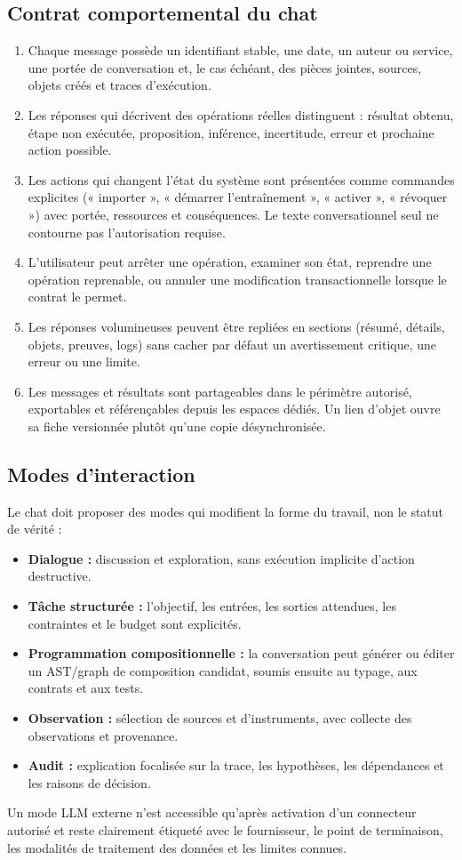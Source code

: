 \documentclass[11pt,a4paper]{article}
\begin{document}
\subsection{Contrat comportemental du chat}
\begin{enumerate}
\item Chaque message possède un identifiant stable, une date, un auteur ou service, une portée de conversation et, le cas échéant, des pièces jointes, sources, objets créés et traces d'exécution.
\item Les réponses qui décrivent des opérations réelles distinguent : résultat obtenu, étape non exécutée, proposition, inférence, incertitude, erreur et prochaine action possible.
\item Les actions qui changent l'état du système sont présentées comme commandes explicites (« importer », « démarrer l'entraînement », « activer », « révoquer ») avec portée, ressources et conséquences. Le texte conversationnel seul ne contourne pas l'autorisation requise.
\item L'utilisateur peut arrêter une opération, examiner son état, reprendre une opération reprenable, ou annuler une modification transactionnelle lorsque le contrat le permet.
\item Les réponses volumineuses peuvent être repliées en sections (résumé, détails, objets, preuves, logs) sans cacher par défaut un avertissement critique, une erreur ou une limite.
\item Les messages et résultats sont partageables dans le périmètre autorisé, exportables et référençables depuis les espaces dédiés. Un lien d'objet ouvre sa fiche versionnée plutôt qu'une copie désynchronisée.
\end{enumerate}

\subsection{Modes d'interaction}
Le chat doit proposer des modes qui modifient la forme du travail, non le statut de vérité :
\begin{itemize}
\item \textbf{Dialogue :} discussion et exploration, sans exécution implicite d'action destructive.
\item \textbf{Tâche structurée :} l'objectif, les entrées, les sorties attendues, les contraintes et le budget sont explicités.
\item \textbf{Programmation compositionnelle :} la conversation peut générer ou éditer un AST/graph de composition candidat, soumis ensuite au typage, aux contrats et aux tests.
\item \textbf{Observation :} sélection de sources et d'instruments, avec collecte des observations et provenance.
\item \textbf{Audit :} explication focalisée sur la trace, les hypothèses, les dépendances et les raisons de décision.
\end{itemize}
Un mode LLM externe n'est accessible qu'après activation d'un connecteur autorisé et reste clairement étiqueté avec le fournisseur, le point de terminaison, les modalités de traitement des données et les limites connues.
\end{document}
